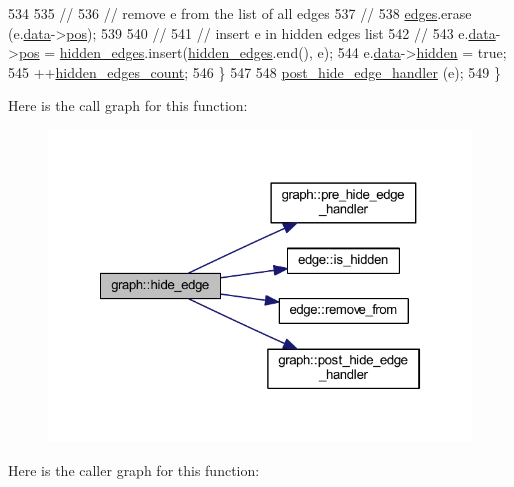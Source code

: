 \begin{DoxyCode}
534 
535     \textcolor{comment}{//}
536     \textcolor{comment}{// remove e from the list of all edges}
537     \textcolor{comment}{//}
538     \mbox{\hyperlink{classgraph_ab5b1c610cca1bcf72b05aacc28a48153}{edges}}.erase (e.\mbox{\hyperlink{classedge_a0ebb6dfa28b77f47529085049352b436}{data}}->\mbox{\hyperlink{classedge__data_a178a8fd40a6ec8139291f96a7807f711}{pos}});
539 
540     \textcolor{comment}{//}
541     \textcolor{comment}{// insert e in hidden edges list}
542     \textcolor{comment}{//}
543     e.\mbox{\hyperlink{classedge_a0ebb6dfa28b77f47529085049352b436}{data}}->\mbox{\hyperlink{classedge__data_a178a8fd40a6ec8139291f96a7807f711}{pos}} = \mbox{\hyperlink{classgraph_a0d3da33d047ba7cdc3dc68b5d9c84b88}{hidden\_edges}}.insert(\mbox{\hyperlink{classgraph_a0d3da33d047ba7cdc3dc68b5d9c84b88}{hidden\_edges}}.end(), e);
544     e.\mbox{\hyperlink{classedge_a0ebb6dfa28b77f47529085049352b436}{data}}->\mbox{\hyperlink{classedge__data_af8dc68051e5fe3336aa31ae1f3e104c3}{hidden}} = \textcolor{keyword}{true};
545     ++\mbox{\hyperlink{classgraph_a3151f544e049fbd985204ca9d8f74c97}{hidden\_edges\_count}};
546     \}
547 
548     \mbox{\hyperlink{classgraph_ad4614e74a125054eb3e180f6f32ab7bb}{post\_hide\_edge\_handler}} (e);
549 \}
\end{DoxyCode}
Here is the call graph for this function\+:
\nopagebreak
\begin{figure}[H]
\begin{center}
\leavevmode
\includegraphics[width=322pt]{classgraph_ab2f8520bcac080d73c55228fecc61825_cgraph}
\end{center}
\end{figure}
Here is the caller graph for this function\+:
\nopagebreak
